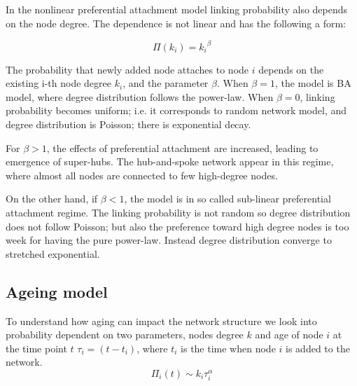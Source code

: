 In the nonlinear preferential attachment model linking probability also depends on the node degree. The dependence is not linear and has the following a form:

\begin{equation}
\Pi(k_i) = {k_i}^{\beta}
\end{equation} 

The probability that newly added node attaches to node $i$ depends on the existing i-th node degree $k_i$, and the parameter $\beta$. When $\beta=1$, the model is BA model, where degree distribution follows the power-law. When $\beta=0$, linking probability becomes uniform; i.e. it corresponds to random network model, and degree distribution is Poisson; there is exponential decay. 

For $\beta>1$, the effects of preferential attachment are increased, leading to emergence of super-hubs. The hub-and-spoke network appear in this regime, where almost all nodes are connected to few high-degree nodes. %

On the other hand, if $\beta<1$, the model is in so called sub-linear preferential attachment regime. The linking probability is not random so degree distribution does not follow Poisson; but also the preference toward high degree nodes is too week for having the pure power-law. Instead degree distribution converge to stretched exponential.



\subsection{Ageing model}

To understand how aging can impact the network structure we look into probability dependent on two parameters, nodes degree $k$ and age of node $i$ at the time point $t$ $\tau_i=(t-t_i)$, where $t_i$ is the time when node $i$ is added to the network. 
\begin{equation}
\Pi_{i}(t)\sim k_{i}\tau_{i}^{\alpha} 
\label{eq:aging}
\end{equation}

